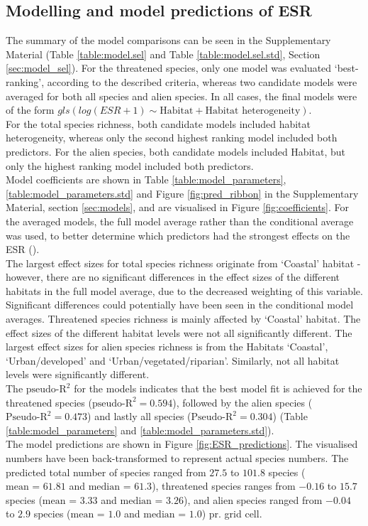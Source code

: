 \documentclass{article}
\begin{document}
\subsection{Modelling and model predictions of ESR}
The summary of the model comparisons can be seen in the Supplementary Material (Table \ref{table:model.sel} and Table \ref{table:model.sel.std}, Section \ref{sec:model_sel}).
For the threatened species, only one model was evaluated `best-ranking', according to the described criteria, whereas two candidate models were averaged for both all species and alien species. In all cases, the final models were of the form
$gls(log(ESR + 1) \sim \text{Habitat} + \text{Habitat heterogeneity} )$. \\
For the total species richness, both candidate models included habitat heterogeneity, whereas only the second highest ranking model included both predictors. For the alien species, both candidate models included Habitat, but only the highest ranking model included both predictors.\\
Model coefficients are shown in Table \ref{table:model_parameters}, \ref{table:model_parameters.std} and Figure \ref{fig:pred_ribbon} in the Supplementary Material, section \ref{sec:models}, and are visualised in Figure \ref{fig:coefficients}. For the averaged models, the full model average rather than the conditional average was used, to better determine which predictors had the strongest effects on the ESR (\cite{Grueber2011}).\\
The largest effect sizes for total species richness originate from `Coastal' habitat - however, there are no significant differences in the effect sizes of the different habitats in the full model average, due to the decreased weighting of this variable. Significant differences could potentially have been seen in the conditional model averages.
Threatened species richness is mainly affected by `Coastal' habitat. The effect sizes of the different habitat levels were not all significantly different. 
The largest effect sizes for alien species richness is from the Habitats `Coastal', `Urban/developed' and `Urban/vegetated/riparian'. Similarly, not all habitat levels were significantly different.\\
The $\text{pseudo-R}^2$ for the models indicates that the best model fit is achieved for the threatened species ($\text{pseudo-R}^2= 0.594$), followed by the alien species ($\text{Pseudo-R}^2= 0.473$) and lastly all species ($\text{Pseudo-R}^2= 0.304$) (Table \ref{table:model_parameters} and \ref{table:model_parameters.std}).\\
The model predictions are shown in Figure \ref{fig:ESR_predictions}. The visualised numbers have been back-transformed to represent actual species numbers. The predicted total number of species ranged from $27.5$ to $101.8$ species ($\text{mean = } 61.81$ and $\text{median = }61.3$), threatened species ranges from $-0.16$ to $15.7$ species ($\text{mean = } 3.33$ and $\text{median = } 3.26$), and alien species ranged from $-0.04$ to $2.9$ species ($\text{mean = } 1.0$ and $\text{median = } 1.0$) pr. grid cell.
\end{document}
